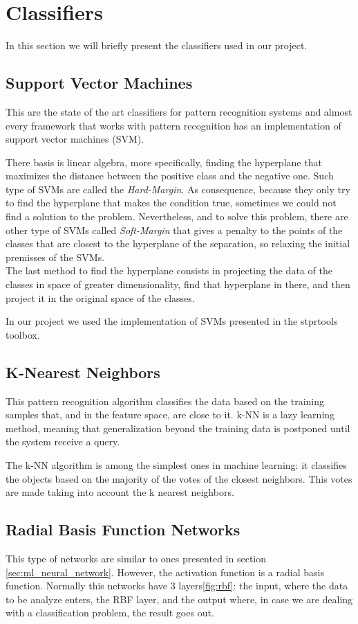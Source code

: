 \documentclass[12pt,a4paper]{report}
\begin{document}
			\section{Classifiers}
			In this section we will briefly present the classifiers used in our project. 
			\subsection{Support Vector Machines}
			This are the state of the art classifiers for pattern recognition systems and almost every framework that works with pattern recognition has an implementation of support vector machines (SVM). 
			
			There basis is linear algebra, more specifically, finding the hyperplane that maximizes the distance between the positive class and the negative one. Such type of SVMs are called the \emph{Hard-Margin}. As consequence, because they only try to find the hyperplane that makes the condition true, sometimes we could not find a solution to the problem. Nevertheless, and to solve this problem, there are other type of SVMs called \emph{Soft-Margin} that gives a penalty to the points of the classes that are closest to the hyperplane of the separation, so relaxing the initial premisses of the SVMs. \\
			The last method to find the hyperplane consists in projecting the data of the classes in space of greater dimensionality, find that hyperplane in there, and then project it in the original space of the classes.
			
			In our project we used the implementation of SVMs presented in the stprtools toolbox.
			
			\subsection{K-Nearest Neighbors}
			
			This pattern recognition algorithm classifies the data based on the training samples that, and in the feature space, are close to it. k-NN is a lazy learning method, meaning that generalization beyond the training data is postponed until the system receive a query.
			
			The k-NN algorithm is among the simplest ones in machine learning: it classifies the objects based on the majority of the votes of the closest neighbors. This votes are made taking into account the k nearest neighbors.
			
			
			\subsection{Radial Basis Function Networks}
			This type of networks are similar to ones presented in section \ref{sec:ml_neural_network}. However, the activation function is a radial basis function. Normally this networks have 3 layers\ref{fig:rbf}: the input, where the data to be analyze enters, the RBF layer, and the output where, in case we are dealing with a classification problem, the result goes out.
			
\end{document}
